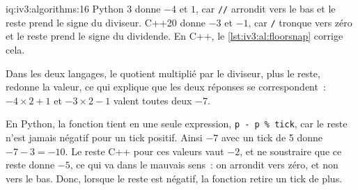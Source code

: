 \begin{solution}{iq:iv3:algorithms:16}
Python 3 donne $-4$ et $1$, car \texttt{//} arrondit vers le bas et le reste prend le signe du diviseur. C++20 donne $-3$ et $-1$, car \texttt{/} tronque vers zéro et le reste prend le signe du dividende. En C++, le \cref{lst:iv3:al:floorsnap} corrige cela.
\label{lst:iv3:al:floorsnap}

Dans les deux langages, le quotient multiplié par le diviseur, plus le reste, redonne la valeur, ce qui explique que les deux réponses se correspondent~: $-4 \times 2 + 1$ et $-3 \times 2 - 1$ valent toutes deux $-7$.

En Python, la fonction tient en une seule expression, \texttt{p - p \% tick}, car le reste n'est jamais négatif pour un tick positif. Ainsi $-7$ avec un tick de 5 donne $-7 - 3 = -10$. Le reste C++ pour ces valeurs vaut $-2$, et ne soustraire que ce reste donne $-5$, ce qui va dans le mauvais sens~: on arrondit vers zéro, et non vers le bas. Donc, lorsque le reste est négatif, la fonction retire un tick de plus.

\end{solution}

